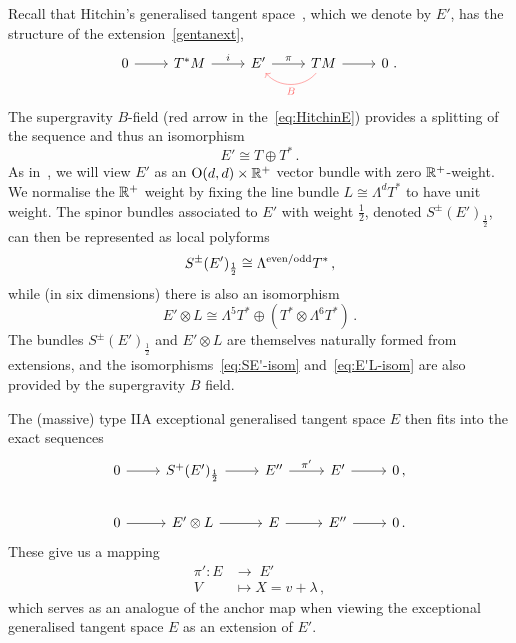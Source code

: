 \documentclass[debug]{phd}
\begin{document}
			Recall that Hitchin's generalised tangent space~\cite{hitch1,gualtphd}, which we denote by $E'$, has the structure of the extension~\eqref{gentanext},
					\begin{equation}\label{eq:HitchinE}
						\begin{tikzcd}
							0 \arrow{r} &T^*M \arrow{r}{i} & E' \arrow{r}{\pi}& TM \arrow[bend left=50, color = red!60]{l}{B} \arrow{r}& 0 \ .
						\end{tikzcd}
					\end{equation}
			The supergravity $B$-field (red arrow in the~\eqref{eq:HitchinE}) provides a splitting of the sequence and thus an isomorphism
					\begin{equation}\label{eq:E'-isom}
						E' \cong T \oplus T^*\,.
					\end{equation}
			As in~\cite{Coimbra:2011nw}, we will view $E'$ as an $\mathrm{O}(d,d)\times\mathbb{R}^+$ vector bundle with zero $\mathbb{R}^+$-weight. We normalise the $\mathbb{R}^+$ weight by fixing the line bundle $L \cong \Lambda^d T^*$ to have unit weight. 
			The spinor bundles associated to $E'$ with weight $\frac{1}{2}$, denoted $S^\pm(E')_{\frac{1}{2}}$, can then be represented as local polyforms
					\begin{equation}\label{eq:SE'-isom}
						S^\pm(E')_{\frac{1}{2}} \cong \Lambda^{\rm even/odd} T^*\,,
					\end{equation}
			while (in six dimensions) there is also an isomorphism
					\begin{equation}\label{eq:E'L-isom}
						E' \otimes L \cong \Lambda^5 T^* \oplus (T^* \otimes \Lambda^6 T^*)\,.
					\end{equation}
			The bundles $S^\pm(E')_{\frac12}$ and $E' \otimes L$ are themselves naturally formed from extensions, and the isomorphisms~\eqref{eq:SE'-isom} and~\eqref{eq:E'L-isom} are also provided by the supergravity $B$ field.

			The (massive) type IIA exceptional generalised tangent space $E$ then fits into the exact sequences
					\begin{equation}\label{eq:Odd-E}
						\begin{tikzcd}
							0 \arrow{r} &S^+(E')_{\frac{1}{2}} \arrow{r} &E'' \arrow{r}{\pi'} & E' \arrow{r} & 0 \, , \\
							0 \arrow{r} & E' \otimes L \arrow{r} &E \arrow{r} & E'' \arrow{r} & 0 \, .
						\end{tikzcd}
					\end{equation}
			These give us a mapping
					\begin{equation}\label{eq:Odd-anchor}
						\begin{aligned}
							\pi' : E &\rightarrow \; E' \\
							V &\mapsto X = v + \lambda\,,
						\end{aligned}
					\end{equation}
			which serves as an analogue of the anchor map when viewing the exceptional generalised tangent space $E$ as an extension of $E'$. 
\end{document}
